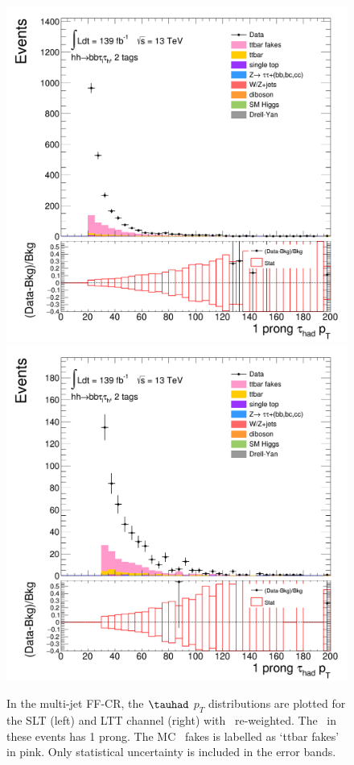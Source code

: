 \begin{figure}[htbp]
\centering
\includegraphics[width=.48\textwidth]{DiHiggs/plots/FF_CRs/InvCR_SLT/HNone/BDTVarsHighMbb/2/C_2tag2pjet_0ptv_TauPt1P.png}
\includegraphics[width=.48\textwidth]{DiHiggs/plots/FF_CRs/InvCR_LTT/HNone/BDTVarsHighMbb/2/C_2tag2pjet_0ptv_TauPt1P.png}\\
\caption{In the multi-jet FF-CR, the $\tauhad$ $p_T$ distributions are plotted 
for the SLT (left) and LTT channel (right) 
with \ttbar\ re-weighted.
The \tauhad\ in these events has 1 prong. 
The MC \ttbar\ fakes is labelled as `ttbar fakes' in pink.
Only statistical uncertainty is included in the error bands.}
\label{fig:InvCR_1}
\end{figure} 

